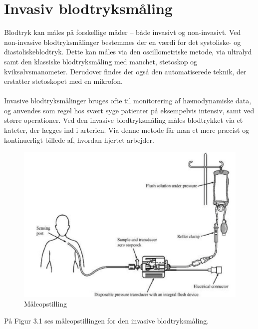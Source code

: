 \section{Invasiv blodtryksmåling}
Blodtryk kan måles på forskellige måder – både invasivt og non-invasivt. Ved non-invasive blodtryksmålinger bestemmes der en værdi for det systoliske- og diastoliskeblodtryk. Dette kan måles via den oscillometriske metode, via ultralyd samt den klassiske blodtryksmåling med manchet, stetoskop og kviksølvsmanometer. Derudover findes der også den automatiserede teknik, der erstatter stetoskopet med en mikrofon. \\\\
Invasive blodtryksmålinger bruges ofte til monitorering af hæmodynamiske data, og anvendes som regel hos svært syge patienter på eksempelvis intensiv, samt ved større operationer. Ved den invasive blodtryksmåling måles blodtrykket via et kateter, der lægges ind i arterien. Via denne metode får man et mere præcist og kontinuerligt billede af, hvordan hjertet arbejder. 

\begin{figure}[H]
	\centering
	\includegraphics[width=1\textwidth]{Figurer/Snip20151207_50}
	\caption{Måleopstilling}
\end{figure}

På Figur 3.1 ses måleopstillingen for den invasive blodtryksmåling.  

